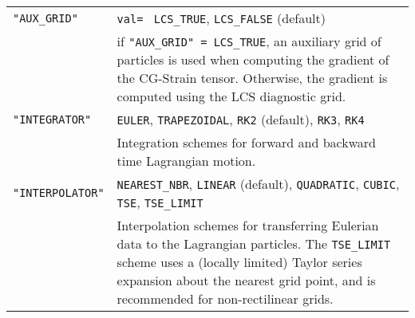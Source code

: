 \documentclass[letterpaper,11pt]{article}
\begin{document}
\begin{longtable}{p{}p{}}
\verb|"AUX_GRID"| & \verb|val= | \verb|LCS_TRUE|, \verb|LCS_FALSE| (default)\\
& if \verb|"AUX_GRID" = LCS_TRUE|, an auxiliary grid of particles is used when computing the gradient of the CG-Strain tensor.  Otherwise, the gradient is computed using the LCS diagnostic grid.\\
\verb|"INTEGRATOR"|&\verb|EULER|, \verb|TRAPEZOIDAL|, \verb|RK2| (default), \verb|RK3|, \verb|RK4|\\
& Integration schemes for forward and backward time Lagrangian motion.\\
\verb|"INTERPOLATOR"| & \verb|NEAREST_NBR|, \verb|LINEAR| (default), \verb|QUADRATIC|, \verb|CUBIC|, \verb|TSE|, \verb|TSE_LIMIT|\\
&Interpolation schemes for transferring Eulerian data to the Lagrangian particles.  The \verb|TSE_LIMIT| scheme uses a (locally limited) Taylor series expansion about the nearest grid point, and   is recommended for non-rectilinear grids.\\
\hline
\end{longtable}
\end{document}
